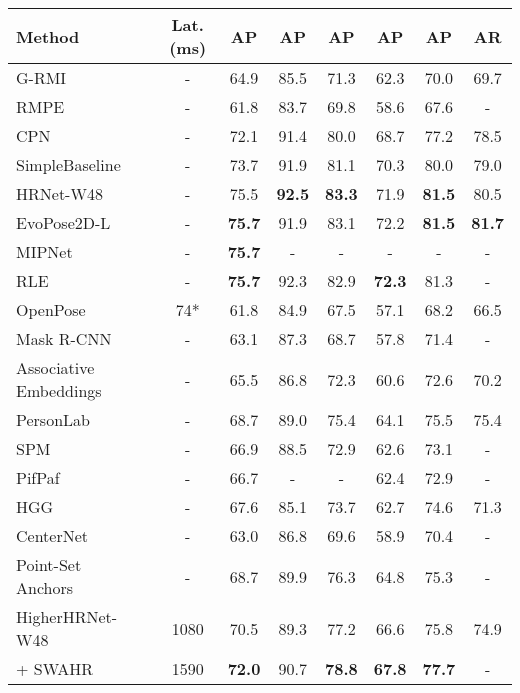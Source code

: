 \documentclass[runningheads]{llncs}
\newcommand\hll[1]{\bgroup
  \hskip0pt\color{black}#1\egroup
}
\begin{document}
\begin{table}[t!]
\centering
\begin{tabular}{l|c|c|c|c|c|c|c}
	\hline
	Method & \hll{Lat. (ms)} & AP & AP & AP & AP & AP & AR\\
	\hline
	\hll{G-RMI~\cite{papandreou2017towards}} & - & 64.9 & 85.5 & 71.3 & 62.3 & 70.0 & 69.7 \\
	\hll{RMPE~\cite{fang2017rmpe}} & - & 61.8 & 83.7 & 69.8 & 58.6 & 67.6 & -\\
	CPN~\cite{chen2018cascaded} & - & 72.1 & 91.4 & 80.0 & 68.7 & 77.2 & 78.5 \\
	SimpleBaseline~\cite{xiao2018simple} & - & 73.7 & 91.9 & 81.1 & 70.3 & 80.0 & 79.0 \\
	HRNet-W48~\cite{sun2019deep} & - & 75.5 & \textbf{92.5} & \textbf{83.3} & 71.9 & \textbf{81.5} & 80.5\\
	EvoPose2D-L~\cite{mcnally2021evopose2d} & - & \textbf{75.7} & 91.9 & 83.1 & 72.2 & \textbf{81.5} & \textbf{81.7}\\
	MIPNet~\cite{khirodkar2021multi} & - & \textbf{75.7} & - & - & - & - & - \\
	RLE~\cite{li2021human} & - & \textbf{75.7} & 92.3 & 82.9 & \textbf{72.3} & 81.3 & - \\
	\hline
OpenPose~\cite{cao2017realtime, cao2018openpose} & 74* & 61.8 & 84.9 & 67.5 & 57.1 & 68.2 & 66.5 \\
	Mask R-CNN~\cite{he2017mask} & - & 63.1 & 87.3 & 68.7 & 57.8 & 71.4 & - \\
	Associative Embeddings~\cite{newell2017associative} & - & 65.5 & 86.8 & 72.3 & 60.6 & 72.6 & 70.2\\
	PersonLab~\cite{papandreou2018personlab}  & - & 68.7 & 89.0 & 75.4 & 64.1 & 75.5 & 75.4 \\
	SPM~\cite{nie2019single} & - & 66.9 & 88.5 & 72.9 & 62.6 & 73.1 & - \\
	PifPaf~\cite{kreiss2019pifpaf} & - & 66.7 & - & - & 62.4 & 72.9 & - \\
	\hll{HGG~\cite{jin2020differentiable}} & - & 67.6 & 85.1 & 73.7 & 62.7 & 74.6 & 71.3 \\
	\hll{CenterNet~\cite{zhou2019objects}} & - & 63.0 & 86.8 & 69.6 & 58.9 & 70.4 & - \\
	\hll{Point-Set Anchors~\cite{wei2020point}} & - & 68.7 & 89.9 & 76.3 & 64.8 & 75.3 & - \\
	HigherHRNet-W48~\cite{cheng2020higherhrnet} & 1080 & 70.5 & 89.3 & 77.2 & 66.6 & 75.8 & 74.9\\ 
	\hll{\quad + SWAHR~\cite{luo2021rethinking}} & 1590 & \textbf{72.0} & 90.7 & \textbf{78.8} & \textbf{67.8} & \textbf{77.7} & - \\

\end{tabular}
\end{table}
\end{document}
